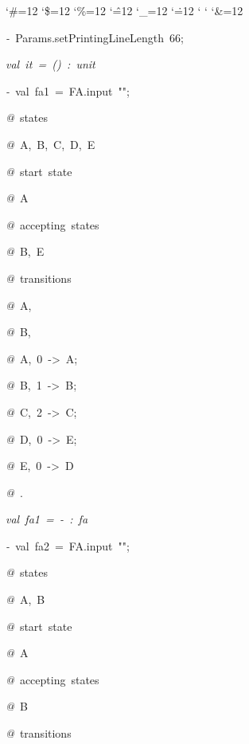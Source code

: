 \begin{list}{}
{\setlength{\leftmargin}{\leftmargini}
\setlength{\rightmargin}{0cm}
\setlength{\itemindent}{0cm}
\setlength{\listparindent}{0cm}
\setlength{\itemsep}{0cm}
\setlength{\parsep}{0cm}
\setlength{\labelsep}{0cm}
\setlength{\labelwidth}{0cm}
\catcode`\#=12
\catcode`\$=12
\catcode`\%=12
\catcode`\^=12
\catcode`\_=12
\catcode`\.=12
\catcode`
\catcode`
\catcode`\&=12
\ttfamily}
\small
\item[]\textsl{-\ }Params.setPrintingLineLength\ 66;
\item[]\textsl{val\ it\ =\ ()\ :\ unit}
\item[]\textsl{-\ }val\ fa1\ =\ FA.input\ "";
\item[]\textsl{@\ }states
\item[]\textsl{@\ }A,\ B,\ C,\ D,\ E
\item[]\textsl{@\ }start\ state
\item[]\textsl{@\ }A
\item[]\textsl{@\ }accepting\ states
\item[]\textsl{@\ }B,\ E
\item[]\textsl{@\ }transitions
\item[]\textsl{@\ }A,\ %
\item[]\textsl{@\ }B,\ %
\item[]\textsl{@\ }A,\ 0\ ->\ A;
\item[]\textsl{@\ }B,\ 1\ ->\ B;
\item[]\textsl{@\ }C,\ 2\ ->\ C;
\item[]\textsl{@\ }D,\ 0\ ->\ E;
\item[]\textsl{@\ }E,\ 0\ ->\ D
\item[]\textsl{@\ }.
\item[]\textsl{val\ fa1\ =\ -\ :\ fa}
\item[]\textsl{-\ }val\ fa2\ =\ FA.input\ "";
\item[]\textsl{@\ }states
\item[]\textsl{@\ }A,\ B
\item[]\textsl{@\ }start\ state
\item[]\textsl{@\ }A
\item[]\textsl{@\ }accepting\ states
\item[]\textsl{@\ }B
\item[]\textsl{@\ }transitions

\end{list}
